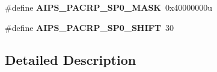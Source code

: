 \begin{DoxyCompactItemize}
\item 
\hypertarget{group___a_i_p_s___register___masks_gabb3f22e5206c6f209190a7d8e9c2ce19}{}\#define {\bfseries A\+I\+P\+S\+\_\+\+P\+A\+C\+R\+P\+\_\+\+S\+P0\+\_\+\+M\+A\+S\+K}~0x40000000u\label{group___a_i_p_s___register___masks_gabb3f22e5206c6f209190a7d8e9c2ce19}

\item 
\hypertarget{group___a_i_p_s___register___masks_ga65473ffce7621c988b3092e426359c51}{}\#define {\bfseries A\+I\+P\+S\+\_\+\+P\+A\+C\+R\+P\+\_\+\+S\+P0\+\_\+\+S\+H\+I\+F\+T}~30\label{group___a_i_p_s___register___masks_ga65473ffce7621c988b3092e426359c51}

\end{DoxyCompactItemize}


\subsection{Detailed Description}
